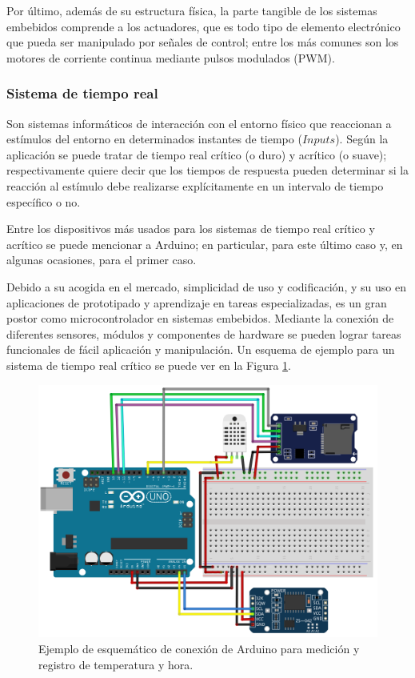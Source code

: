 Por último, además de su estructura física, la parte tangible de los sistemas embebidos comprende a los actuadores, que es todo tipo de elemento electrónico que pueda ser manipulado por señales de control; entre los más comunes son los motores de corriente continua mediante pulsos modulados (PWM).

\subsubsection{Sistema de tiempo real}

Son sistemas informáticos de interacción con el entorno físico que reaccionan a estímulos del entorno en  determinados instantes de tiempo ($Inputs$). Según la aplicación se puede tratar de tiempo real crítico (o duro) y acrítico (o suave); respectivamente quiere decir que los tiempos de respuesta pueden determinar si la reacción al estímulo debe realizarse explícitamente en  un intervalo de tiempo específico o no.

Entre los dispositivos más usados para los sistemas de tiempo real crítico y acrítico se puede mencionar a Arduino; en particular, para este último caso y, en algunas ocasiones, para el primer caso.

Debido a su acogida en el mercado, simplicidad de uso y codificación, y su uso en aplicaciones de prototipado y aprendizaje en tareas especializadas, es un gran postor como microcontrolador  en sistemas embebidos. Mediante la conexión de diferentes sensores, módulos y componentes de hardware se pueden lograr tareas funcionales de fácil aplicación y manipulación. Un esquema de ejemplo para un sistema de tiempo real crítico se puede ver en la Figura \ref{esquematico1png}.

\begin{figure}[H]
 \begin{center}
 \includegraphics[scale=0.35]{img/esquematico1.png}
 \end{center}
 \caption{Ejemplo de esquemático de conexión de Arduino para medición y registro de temperatura y hora. \label{esquematico1png}}
\end{figure}

